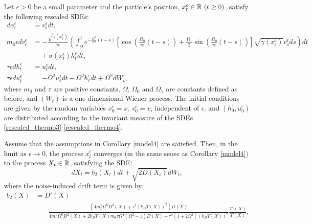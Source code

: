 \begin{corollary} \label{cor_thermo_2} Let $\epsilon > 0$ be a small parameter and the particle's position, $x^\epsilon_t \in \mathbb{R} \ (t \geq 0)$, satisfy the following rescaled SDEs:
\begin{align}
dx^\epsilon_t &= v^\epsilon_t dt, \label{rescaled_thermo1} \\
m_0 \epsilon dv^\epsilon_{t} &= -\frac{\sqrt{\gamma(x^\epsilon_{t})}}{\tau \epsilon} \left( \int_{0}^{t} e^{-\frac{\Omega^2}{2\tau \epsilon}\left(t-s\right)}\left[\cos\left(\frac{\Omega_{0}}{\tau \epsilon}(t-s) \right) + \frac{\Omega_{1}}{2} \sin\left(\frac{\Omega_{0}}{\tau \epsilon}(t-s) \right) \right] \sqrt{\gamma(x^\epsilon_s)} v^\epsilon_{s} ds \right) dt \nonumber \\ 
&\ \ \ \ \ + \sigma(x^\epsilon_{t}) h^\epsilon_{t} dt, \label{rescaled_thermo2} \\
\tau \epsilon dh^\epsilon_t &= u^\epsilon_t dt,    \label{rescaled_thermo3} \\
\tau \epsilon du^\epsilon_t &= -\Omega^2 u^\epsilon_t dt - \Omega^2 h^\epsilon_t dt + \Omega^2 dW_t, \label{rescaled_thermo4}
\end{align}
where $m_0$ and $\tau$ are positive constants, $\Omega$, $\Omega_0$ and $\Omega_1$ are constants defined as before, and $(W_t)$ is a one-dimensional Wiener process. The initial conditions are given by the random variables $x^\epsilon_0 = x$, $v^\epsilon_0 = v$, independent of $\epsilon$, and $(h^\epsilon_0, u^\epsilon_0)$ are distributed according to the invariant measure of the SDEs \eqref{rescaled_thermo3}-\eqref{rescaled_thermo4}. 

Assume that the assumptions in Corollary \ref{model4} are satisfied. Then, in the limit as $\epsilon \to 0$, the process $x^\epsilon_t$ converges (in the same sense as Corollary \ref{model4}) to the process $X_{t} \in \mathbb{R}$, satisfying the SDE: 
\begin{equation}dX_{t} = b_{2}(X_{t}) dt + \sqrt{2D(X_{t})} dW_{t}, \end{equation}
where the noise-induced drift term is given by:
\begin{align}
b_{2}(X) &= D'(X) \\ 
&\ \ \ - \frac{(4m_{0}^2 \Omega^6 D^2(X)+\tau^2 (k_{B}T(X))^2)D(X)}{4m_{0}^2 \Omega^6 D^2(X)+2k_{B}T(X)m_{0}\tau \Omega^4(\Omega^2-1)D(X)+\tau^2(1+2\Omega^2)(k_{B}T(X))^2}\frac{T'(X)}{T(X)}.
\end{align}
\end{corollary}


